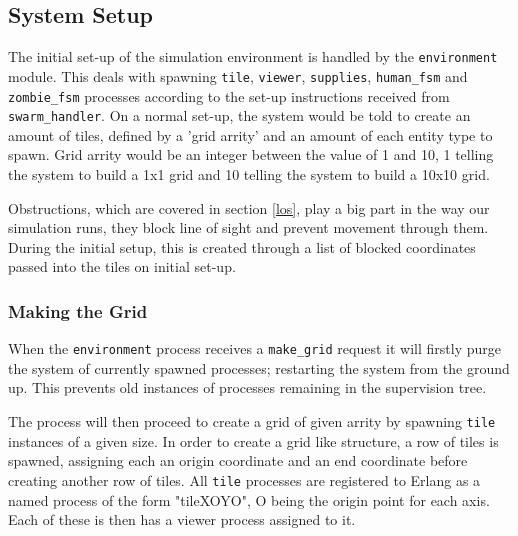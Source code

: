 \subsection{System Setup}
\label{system_setup}
The initial set-up of the simulation environment is handled by the \verb+environment+ module. This deals with spawning \verb+tile+, \verb+viewer+, \verb+supplies+, \verb+human_fsm+ and \verb+zombie_fsm+ processes according to the set-up instructions received from \verb+swarm_handler+. On a normal set-up, the system would be told to create an amount of tiles, defined by a 'grid arrity' and an amount of each entity type to spawn. Grid arrity would be an integer between the value of 1 and 10, 1 telling the system to build a 1x1 grid and 10 telling the system to build a 10x10 grid.

Obstructions, which are covered in section \ref{los}, play a big part in the way our simulation runs, they block line of sight and prevent movement through them. During the initial setup, this is created through a list of blocked coordinates passed into the tiles on initial set-up.

\subsubsection{Making the Grid}
When the \verb+environment+ process receives a \verb+make_grid+ request it will firstly purge the system of currently spawned processes; restarting the system from the ground up. This prevents old instances of processes remaining in the supervision tree.

The process will then proceed to create a grid of given arrity by spawning \verb+tile+ instances of a given size. In order to create a grid like structure, a row of tiles is spawned, assigning each an origin coordinate and an end coordinate before creating another row of tiles. All \verb+tile+ processes are registered to Erlang as a named process of the form "tileXOYO", O being the origin point for each axis. Each of these is then has a viewer process assigned to it.

\clearpage
\endinput
